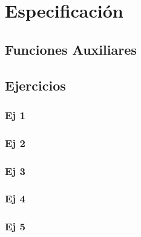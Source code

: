 \documentclass[10pt,a4paper]{article}
\begin{document}
\maketitle

\section{Especificación}

\subsection{Funciones Auxiliares}


\subsection{Ejercicios}

\subsubsection{Ej 1}
% 

\subsubsection{Ej 2}


\subsubsection{Ej 3}


\subsubsection{Ej 4}


\subsubsection{Ej 5}
%
\end{document}
